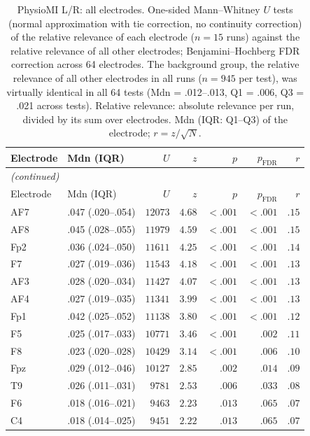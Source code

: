 {\small\setlength{\tabcolsep}{4pt}
\begin{longtable}{llrrrrr}
\caption{PhysioMI L/R: all electrodes. One-sided Mann--Whitney $U$ tests (normal approximation with tie correction, no continuity correction) of the relative relevance of each electrode ($n = 15$ runs) against the relative relevance of all other electrodes; Benjamini--Hochberg FDR correction across 64 electrodes. The background group, the relative relevance of all other electrodes in all runs ($n = 945$ per test), was virtually identical in all 64 tests (Mdn = .012--.013, Q1 = .006, Q3 = .021 across tests). Relative relevance: absolute relevance per run, divided by its sum over electrodes. Mdn (IQR: Q1--Q3) of the electrode; $r = z / \sqrt{N}$.}\label{tab:physiomi_electrode_mwu_all} \\
\toprule
Electrode & Mdn (IQR) & $U$ & $z$ & $p$ & $p_{\mathrm{FDR}}$ & $r$ \\
\midrule
\endfirsthead
\multicolumn{7}{l}{\emph{(continued)}} \\
\toprule
Electrode & Mdn (IQR) & $U$ & $z$ & $p$ & $p_{\mathrm{FDR}}$ & $r$ \\
\midrule
\endhead
\bottomrule
\endfoot
AF7 & .047 (.020--.054) & $12073$ & $4.68$ & $< .001$ & $< .001$ & $.15$ \\
AF8 & .045 (.028--.055) & $11979$ & $4.59$ & $< .001$ & $< .001$ & $.15$ \\
Fp2 & .036 (.024--.050) & $11611$ & $4.25$ & $< .001$ & $< .001$ & $.14$ \\
F7 & .027 (.019--.036) & $11543$ & $4.18$ & $< .001$ & $< .001$ & $.13$ \\
AF3 & .028 (.020--.034) & $11427$ & $4.07$ & $< .001$ & $< .001$ & $.13$ \\
AF4 & .027 (.019--.035) & $11341$ & $3.99$ & $< .001$ & $< .001$ & $.13$ \\
Fp1 & .042 (.025--.052) & $11138$ & $3.80$ & $< .001$ & $< .001$ & $.12$ \\
F5 & .025 (.017--.033) & $10771$ & $3.46$ & $< .001$ & $.002$ & $.11$ \\
F8 & .023 (.020--.028) & $10429$ & $3.14$ & $< .001$ & $.006$ & $.10$ \\
Fpz & .029 (.012--.046) & $10127$ & $2.85$ & $.002$ & $.014$ & $.09$ \\
T9 & .026 (.011--.031) & $9781$ & $2.53$ & $.006$ & $.033$ & $.08$ \\
F6 & .018 (.016--.021) & $9463$ & $2.23$ & $.013$ & $.065$ & $.07$ \\
C4 & .018 (.014--.025) & $9451$ & $2.22$ & $.013$ & $.065$ & $.07$ \\

\end{longtable}}
